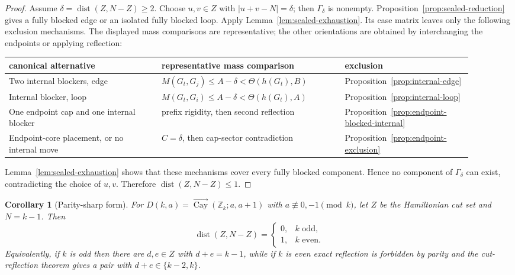 \documentclass[11pt]{article}
\newtheorem{corollary}[theorem]{Corollary}
\newcommand{\Cay}{\overrightarrow{\operatorname{Cay}}}
\newcommand{\Z}{\mathbb Z}
\newcommand{\dist}{\operatorname{dist}}
\begin{document}
\begin{proof}
Assume $\delta=\dist(Z,N-Z)\ge2$.  Choose $u,v\in Z$ with $|u+v-N|=\delta$; then $\Gamma_\delta$ is nonempty.  Proposition~\ref{prop:sealed-reduction} gives a fully blocked edge or an isolated fully blocked loop.  Apply Lemma~\ref{lem:sealed-exhaustion}.  Its case matrix leaves only the following exclusion mechanisms.  The displayed mass comparisons are representative; the other orientations are obtained by interchanging the endpoints or applying reflection:
\begin{center}
\small
\begin{tabular}{@{}>{\raggedright\arraybackslash}p{0.30\linewidth}>{\raggedright\arraybackslash}p{0.36\linewidth}>{\raggedright\arraybackslash}p{0.25\linewidth}@{}}
\textbf{canonical alternative} & \textbf{representative mass comparison} & \textbf{exclusion}\\ \hline
Two internal blockers, edge & $M(G_t,G_j)\le A-\delta<\Theta(h(G_t),B)$ & Proposition~\ref{prop:internal-edge}\\
Internal blocker, loop & $M(G_t,G_i)\le A-\delta<\Theta(h(G_t),A)$ & Proposition~\ref{prop:internal-loop}\\
One endpoint cap and one internal blocker & prefix rigidity, then second reflection & Proposition~\ref{prop:endpoint-blocked-internal}\\
Endpoint-core placement, or no internal move & $C=\delta$, then cap-sector contradiction & Proposition~\ref{prop:endpoint-exclusion}
\end{tabular}
\end{center}
Lemma~\ref{lem:sealed-exhaustion} shows that these mechanisms cover every fully blocked component.  Hence no component of $\Gamma_\delta$ can exist, contradicting the choice of $u,v$.  Therefore $\dist(Z,N-Z)\le1$.
\end{proof}

\begin{corollary}[Parity-sharp form]\label{cor:parity-sharp}
For $D(k,a)=\Cay(\Z_k;a,a+1)$ with $a\not\equiv0,-1\pmod{k}$, let $Z$ be the Hamiltonian cut set and $N=k-1$.  Then
\[
        \dist(Z,N-Z)=
        \begin{cases}
        0,& k\text{ odd},\\
        1,& k\text{ even}.
        \end{cases}
\]
Equivalently, if $k$ is odd then there are $d,e\in Z$ with $d+e=k-1$, while if $k$ is even exact reflection is forbidden by parity and the cut-reflection theorem gives a pair with $d+e\in\{k-2,k\}$.
\end{corollary}
\end{document}

